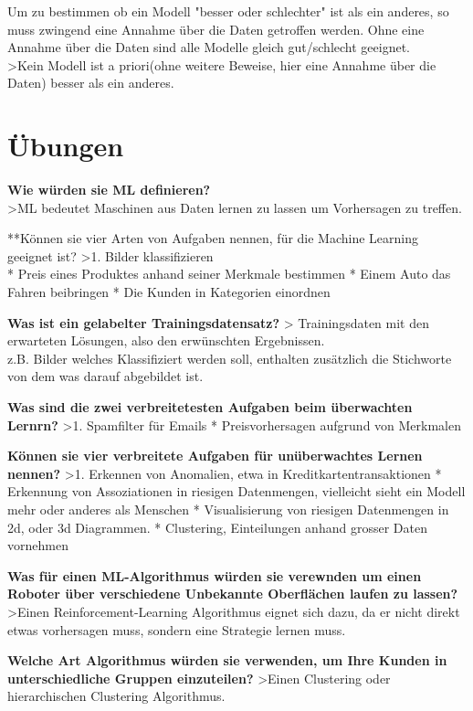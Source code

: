 \documentclass[11pt]{article}
\begin{document}
Um zu bestimmen ob ein Modell "besser oder schlechter" ist als ein
anderes, so muss zwingend eine Annahme über die Daten getroffen werden.
Ohne eine Annahme über die Daten sind alle Modelle gleich gut/schlecht
geeignet.\\
\textgreater{}Kein Modell ist a priori(ohne weitere Beweise, hier eine
Annahme über die Daten) besser als ein anderes.

    \section{Übungen}\label{uxfcbungen}

\textbf{Wie würden sie ML definieren?}\\
\textgreater{}ML bedeutet Maschinen aus Daten lernen zu lassen um
Vorhersagen zu treffen.

**Können sie vier Arten von Aufgaben nennen, für die Machine Learning
geeignet ist? \textgreater{}1. Bilder klassifizieren\\
* Preis eines Produktes anhand seiner Merkmale bestimmen * Einem Auto
das Fahren beibringen * Die Kunden in Kategorien einordnen

\textbf{Was ist ein gelabelter Trainingsdatensatz?} \textgreater{}
Trainingsdaten mit den erwarteten Lösungen, also den erwünschten
Ergebnissen.\\
z.B. Bilder welches Klassifiziert werden soll, enthalten zusätzlich die
Stichworte von dem was darauf abgebildet ist.

\textbf{Was sind die zwei verbreitetesten Aufgaben beim überwachten
Lernrn?} \textgreater{}1. Spamfilter für Emails * Preisvorhersagen
aufgrund von Merkmalen

\textbf{Können sie vier verbreitete Aufgaben für unüberwachtes Lernen
nennen?} \textgreater{}1. Erkennen von Anomalien, etwa in
Kreditkartentransaktionen * Erkennung von Assoziationen in riesigen
Datenmengen, vielleicht sieht ein Modell mehr oder anderes als Menschen
* Visualisierung von riesigen Datenmengen in 2d, oder 3d Diagrammen. *
Clustering, Einteilungen anhand grosser Daten vornehmen

\textbf{Was für einen ML-Algorithmus würden sie verewnden um einen
Roboter über verschiedene Unbekannte Oberflächen laufen zu lassen?}
\textgreater{}Einen Reinforcement-Learning Algorithmus eignet sich dazu,
da er nicht direkt etwas vorhersagen muss, sondern eine Strategie lernen
muss.

\textbf{Welche Art Algorithmus würden sie verwenden, um Ihre Kunden in
unterschiedliche Gruppen einzuteilen?} \textgreater{}Einen Clustering
oder hierarchischen Clustering Algorithmus.
\end{document}
